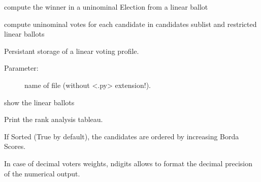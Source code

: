 \documentclass[letterpaper,10pt,english]{sphinxmanual}
\begin{document}
\begin{fulllineitems}
\begin{fulllineitems}
\label{techDoc:votingDigraphs.LinearVotingProfile.computeSimpleMajorityWinner}
compute the winner in a uninominal Election from a linear ballot

\end{fulllineitems}


\begin{fulllineitems}
\label{techDoc:votingDigraphs.LinearVotingProfile.computeUninominalVotes}
compute uninominal votes for each candidate in candidates sublist
and restricted linear ballots

\end{fulllineitems}


\begin{fulllineitems}
\label{techDoc:votingDigraphs.LinearVotingProfile.save}
Persistant storage of a linear voting profile.
\begin{description}
\item[{Parameter:}] \leavevmode
name of file (without \textless{}.py\textgreater{} extension!).

\end{description}

\end{fulllineitems}


\begin{fulllineitems}
\label{techDoc:votingDigraphs.LinearVotingProfile.showLinearBallots}
show the linear ballots

\end{fulllineitems}


\begin{fulllineitems}
\label{techDoc:votingDigraphs.LinearVotingProfile.showRankAnalysisTable}
Print the rank analysis tableau.

If Sorted (True by default), the candidates
are ordered by increasing Borda Scores.

In case of decimal voters weights, ndigits allows
to format the decimal precision of the numerical output.

\end{fulllineitems}


\end{fulllineitems}
\end{document}
